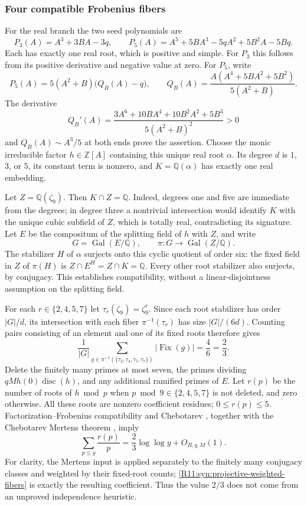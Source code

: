 \documentclass[11pt,a4paper]{article}
\theoremstyle{definition}\newtheorem{definition}[theorem]{Definition}
\theoremstyle{remark}\newtheorem{remark}[theorem]{Remark}
\begin{document}
\subsubsection{Four compatible Frobenius fibers}

For the real branch the two seed polynomials are
\[
 P_3(A)=A^3+3BA-3q,
 \qquad
 P_5(A)=A^5+5BA^3-5qA^2+5B^2A-5Bq.
\]
Each has exactly one real root, which is positive and simple.
For $P_3$ this follows from its positive derivative and negative value
at zero. For $P_5$, write
\[
 P_5(A)=5(A^2+B)\bigl(Q_B(A)-q\bigr),\qquad
 Q_B(A)=\frac{A(A^4+5BA^2+5B^2)}{5(A^2+B)}.
\]
The derivative
\[
 Q_B'(A)=\frac{3A^6+10BA^4+10B^2A^2+5B^3}{5(A^2+B)^2}>0
\]
and $Q_B(A)\sim A^3/5$ at both ends prove the assertion.
Choose the monic irreducible factor $h\in\mathbb Z[A]$ containing
this unique real root $\alpha$. Its degree $d$ is $1$, $3$, or $5$,
its constant term is nonzero, and $K=\mathbb Q(\alpha)$ has exactly
one real embedding.

Let $Z=\mathbb Q(\zeta_9)$. Then $K\cap Z=\mathbb Q$.
Indeed, degrees one and five are immediate from the degrees;
in degree three a nontrivial intersection would identify $K$ with
the unique cubic subfield of $Z$, which is totally real, contradicting
its signature. Let $E$ be the compositum of the splitting field of
$h$ with $Z$, and write
\[
 G=\operatorname{Gal}(E/\mathbb Q),\qquad
 \pi:G\longrightarrow\operatorname{Gal}(Z/\mathbb Q).
\]
The stabilizer $H$ of $\alpha$ surjects onto this cyclic quotient of
order six: the fixed field in $Z$ of $\pi(H)$ is
$Z\cap E^H=Z\cap K=\mathbb Q$.
Every other root stabilizer also surjects, by conjugacy.
This establishes compatibility, without a linear-disjointness
assumption on the splitting field.

For each $r\in\{2,4,5,7\}$ let $\tau_r(\zeta_9)=\zeta_9^r$.
Since each root stabilizer has order $|G|/d$, its intersection with
each fiber $\pi^{-1}(\tau_r)$ has size $|G|/(6d)$.
Counting pairs consisting of an element and one of its fixed roots
therefore gives
\begin{equation}\label{R11:syn:projective-weighted-fibers}
 \frac1{|G|}
 \sum_{g\in\pi^{-1}(\{\tau_2,\tau_4,\tau_5,\tau_7\})}
      |\operatorname{Fix}(g)|=\frac46=\frac23.
\end{equation}
Delete the finitely many primes at most seven, the primes dividing
$qM h(0)\operatorname{disc}(h)$, and any additional ramified primes
of $E$. Let $r(p)$ be the number of roots of $h\bmod p$ when
$p\bmod9\in\{2,4,5,7\}$ is not deleted, and zero otherwise.
All these roots are nonzero coefficient residues; $0\le r(p)\le5$.
Factorization--Frobenius compatibility and Chebotarev
\cite[Fact~2.1 and Theorem~3.1]{Lenstra}, together with the
Chebotarev Mertens theorem \cite[Theorem~A]{R11-AKK}, imply
\begin{equation}\label{R11:syn:projective-weighted-mertens}
 \sum_{p\le y}\frac{r(p)}p
       =\frac23\log\log y+O_{B,q,M}(1).
\end{equation}
For clarity, the Mertens input is applied separately to the finitely
many conjugacy classes and weighted by their fixed-root counts;
\eqref{R11:syn:projective-weighted-fibers} is exactly the resulting
coefficient. Thus the value $2/3$ does not come from an unproved
independence heuristic.
\end{document}
